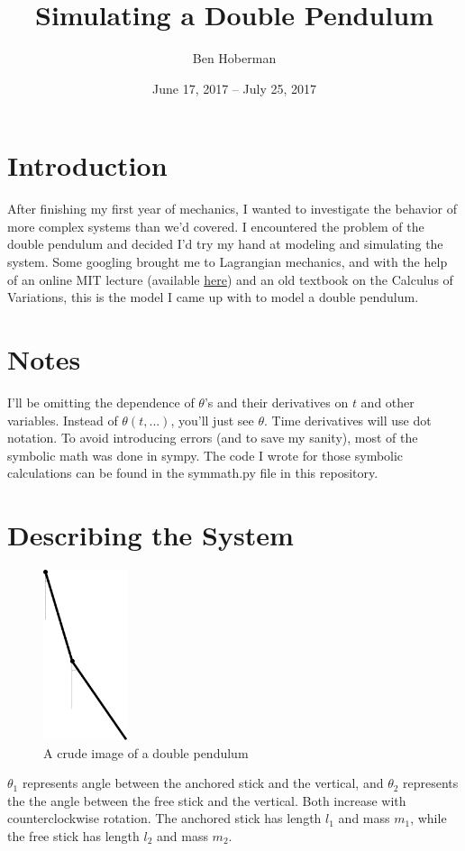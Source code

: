 \documentclass[]{article}
\title{Simulating a Double Pendulum}
\author{Ben Hoberman}
\begin{document}
	
\date{June 17, 2017 -- July 25, 2017}
\maketitle

\newcommand{\lagr}{\mathcal{L}}

\section{Introduction}

After finishing my first year of mechanics, I wanted to investigate the behavior of more complex systems than we'd covered. I encountered the problem of the double pendulum and decided I'd try my hand at modeling and simulating the system. Some googling brought me to Lagrangian mechanics, and with the help of an online MIT lecture (available \href{https://www.youtube.com/watch?v=zhk9xLjrmi4&t=3925s}{here}) and an old textbook on the Calculus of Variations, this is the model I came up with to model a double pendulum.

\section{Notes}

I'll be omitting the dependence of $\theta$'s and their derivatives on $t$ and other variables. Instead of $\theta{(t, ...)}$, you'll just see $\theta$. Time derivatives will use dot notation. To avoid introducing errors (and to save my sanity), most of the symbolic math was done in sympy. The code I wrote for those symbolic calculations can be found in the symmath.py file in this repository.

\section{Describing the System}
\begin{figure}[h!]
	\includegraphics[height=5cm]{situation}
	\caption{A crude image of a double pendulum}
\end{figure}
$\theta_1$ represents angle between the anchored stick and the vertical, and $\theta_2$ represents the the angle between the free stick and the vertical. Both increase with counterclockwise rotation. The anchored stick has length $l_1$ and mass $m_1$, while the free stick has length $l_2$ and mass $m_2$.
\end{document}
